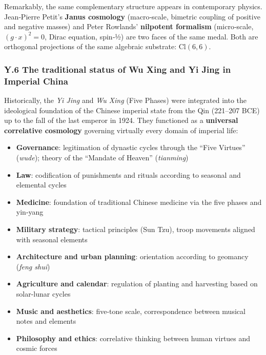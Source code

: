 \documentclass[11pt]{article}
\providecommand{\tightlist}{\setlength{\itemsep}{2pt}\setlength{\parskip}{6pt}}
\providecommand{\tightlist}{%
  \setlength{\itemsep}{2pt}\setlength{\parskip}{6pt}
}
\begin{document}
Remarkably, the same complementary structure appears in contemporary
physics. Jean‑Pierre Petit's \textbf{Janus cosmology} (macro‑scale,
bimetric coupling of positive and negative masses) and Peter Rowlands'
\textbf{nilpotent formalism} (micro‑scale, \((g\cdot x)^2=0\), Dirac
equation, spin‑½) are two faces of the same medal. Both are orthogonal
projections of the same algebraic substrate: \(\mathrm{Cl}(6,6)\).

\hypertarget{y.6-the-traditional-status-of-wu-xing-and-yi-jing-in-imperial-china}{%
\subsubsection{Y.6 The traditional status of Wu Xing and Yi Jing in
Imperial
China}\label{y.6-the-traditional-status-of-wu-xing-and-yi-jing-in-imperial-china}}

Historically, the \emph{Yi Jing} and \emph{Wu Xing} (Five Phases) were
integrated into the ideological foundation of the Chinese imperial state
from the Qin (221--207 BCE) up to the fall of the last emperor in 1924.
They functioned as a \textbf{universal correlative cosmology} governing
virtually every domain of imperial life:

\begin{itemize}
\tightlist
\item
  \textbf{Governance}: legitimation of dynastic cycles through the
  ``Five Virtues'' (\emph{wude}); theory of the ``Mandate of Heaven''
  (\emph{tianming})
\item
  \textbf{Law}: codification of punishments and rituals according to
  seasonal and elemental cycles
\item
  \textbf{Medicine}: foundation of traditional Chinese medicine via the
  five phases and yin‑yang
\item
  \textbf{Military strategy}: tactical principles (Sun Tzu), troop
  movements aligned with seasonal elements
\item
  \textbf{Architecture and urban planning}: orientation according to
  geomancy (\emph{feng shui})
\item
  \textbf{Agriculture and calendar}: regulation of planting and
  harvesting based on solar-lunar cycles
\item
  \textbf{Music and aesthetics}: five-tone scale, correspondence between
  musical notes and elements
\item
  \textbf{Philosophy and ethics}: correlative thinking between human
  virtues and cosmic forces
\end{itemize}
\end{document}
